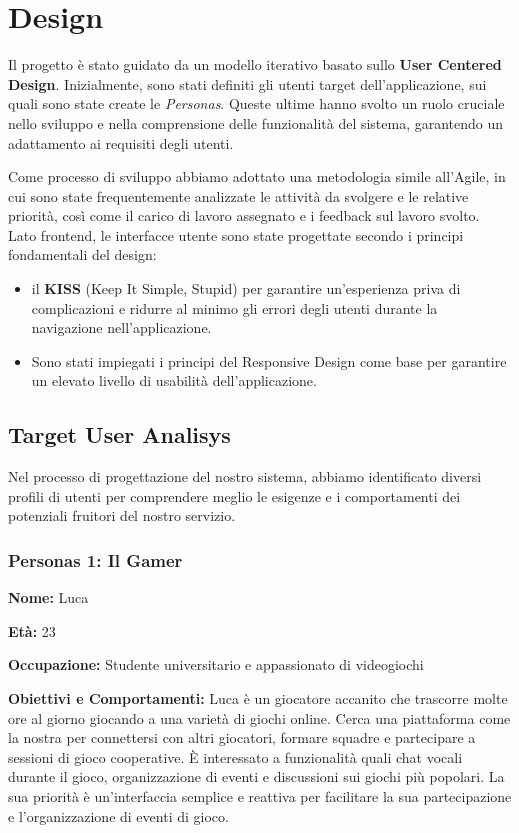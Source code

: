 \chapter{Design}

Il progetto è stato guidato da un modello iterativo basato sullo \textbf{User Centered Design}.
%
Inizialmente, sono stati definiti gli utenti target dell'applicazione, sui quali sono state create le \textit{Personas}.
%
Queste ultime hanno svolto un ruolo cruciale nello sviluppo e nella comprensione delle funzionalità del sistema, garantendo un adattamento ai requisiti degli utenti.

Come processo di sviluppo abbiamo adottato una metodologia simile all'Agile, in cui sono state frequentemente analizzate le attività da svolgere e le relative priorità, così come il carico di lavoro assegnato e i feedback sul lavoro svolto.
%
Lato frontend, le interfacce utente sono state progettate secondo i principi fondamentali del design:

\begin{itemize}
    \item il \textbf{KISS} (Keep It Simple, Stupid) per garantire un'esperienza priva di complicazioni e ridurre al minimo gli errori degli utenti durante la navigazione nell'applicazione.
    \item Sono stati impiegati i principi del Responsive Design come base per garantire un elevato livello di usabilità dell'applicazione.
\end{itemize}

%
%
%
\section{Target User Analisys}

Nel processo di progettazione del nostro sistema, abbiamo identificato diversi profili di utenti per comprendere meglio le esigenze e i comportamenti dei potenziali fruitori del nostro servizio.

%
%
%
\subsection{Personas 1: Il Gamer}

\textbf{Nome:} Luca

\textbf{Età:} 23

\textbf{Occupazione:} Studente universitario e appassionato di videogiochi

\textbf{Obiettivi e Comportamenti:} Luca è un giocatore accanito che trascorre molte ore al giorno giocando a una varietà di giochi online. Cerca una piattaforma come la nostra per connettersi con altri giocatori, formare squadre e partecipare a sessioni di gioco cooperative. È interessato a funzionalità quali chat vocali durante il gioco, organizzazione di eventi e discussioni sui giochi più popolari. La sua priorità è un'interfaccia semplice e reattiva per facilitare la sua partecipazione e l'organizzazione di eventi di gioco.

